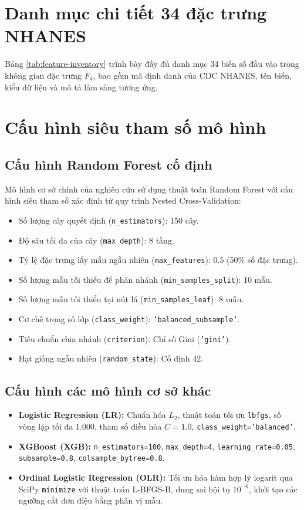 \chapter{Danh mục chi tiết 34 đặc trưng NHANES}
\label{app:feature-inventory}

Bảng \ref{tab:feature-inventory} trình bày đầy đủ danh mục 34 biến số đầu vào trong không gian đặc trưng $F_4$, bao gồm mã định danh của CDC NHANES, tên biến, kiểu dữ liệu và mô tả lâm sàng tương ứng.



\chapter{Cấu hình siêu tham số mô hình}
\label{app:hyperparameters}

\section{Cấu hình Random Forest cố định}
Mô hình cơ sở chính của nghiên cứu sử dụng thuật toán Random Forest với cấu hình siêu tham số xác định từ quy trình Nested Cross-Validation:
\begin{itemize}
    \item Số lượng cây quyết định (\texttt{n\_estimators}): 150 cây.
    \item Độ sâu tối đa của cây (\texttt{max\_depth}): 8 tầng.
    \item Tỷ lệ đặc trưng lấy mẫu ngẫu nhiên (\texttt{max\_features}): 0.5 (50\% số đặc trưng).
    \item Số lượng mẫu tối thiểu để phân nhánh (\texttt{min\_samples\_split}): 10 mẫu.
    \item Số lượng mẫu tối thiểu tại nút lá (\texttt{min\_samples\_leaf}): 8 mẫu.
    \item Cơ chế trọng số lớp (\texttt{class\_weight}): \texttt{'balanced\_subsample'}.
    \item Tiêu chuẩn chia nhánh (\texttt{criterion}): Chỉ số Gini (\texttt{'gini'}).
    \item Hạt giống ngẫu nhiên (\texttt{random\_state}): Cố định 42.
\end{itemize}

\section{Cấu hình các mô hình cơ sở khác}
\begin{itemize}
    \item \textbf{Logistic Regression (LR):} Chuẩn hóa $L_2$, thuật toán tối ưu \texttt{lbfgs}, số vòng lặp tối đa 1.000, tham số điều hòa $C = 1.0$, \texttt{class\_weight='balanced'}.
    \item \textbf{XGBoost (XGB):} \texttt{n\_estimators=100}, \texttt{max\_depth=4}, \texttt{learning\_rate=0.05}, \texttt{subsample=0.8}, \texttt{colsample\_bytree=0.8}.
    \item \textbf{Ordinal Logistic Regression (OLR):} Tối ưu hóa hàm hợp lý logarit qua SciPy \texttt{minimize} với thuật toán L-BFGS-B, dung sai hội tụ $10^{-6}$, khởi tạo các ngưỡng cắt đơn điệu bằng phân vị mẫu.
\end{itemize}

